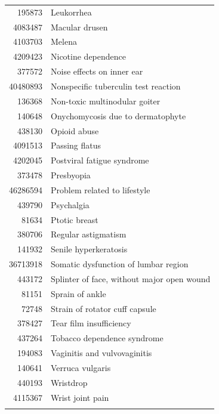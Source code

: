 \documentclass[11pt]{book}
\begin{document}
\begin{longtable}[]{@{}rl@{}}
195873 & Leukorrhea\tabularnewline
4083487 & Macular drusen\tabularnewline
4103703 & Melena\tabularnewline
4209423 & Nicotine dependence\tabularnewline
377572 & Noise effects on inner ear\tabularnewline
40480893 & Nonspecific tuberculin test reaction\tabularnewline
136368 & Non-toxic multinodular goiter\tabularnewline
140648 & Onychomycosis due to dermatophyte\tabularnewline
438130 & Opioid abuse\tabularnewline
4091513 & Passing flatus\tabularnewline
4202045 & Postviral fatigue syndrome\tabularnewline
373478 & Presbyopia\tabularnewline
46286594 & Problem related to lifestyle\tabularnewline
439790 & Psychalgia\tabularnewline
81634 & Ptotic breast\tabularnewline
380706 & Regular astigmatism\tabularnewline
141932 & Senile hyperkeratosis\tabularnewline
36713918 & Somatic dysfunction of lumbar region\tabularnewline
443172 & Splinter of face, without major open wound\tabularnewline
81151 & Sprain of ankle\tabularnewline
72748 & Strain of rotator cuff capsule\tabularnewline
378427 & Tear film insufficiency\tabularnewline
437264 & Tobacco dependence syndrome\tabularnewline
194083 & Vaginitis and vulvovaginitis\tabularnewline
140641 & Verruca vulgaris\tabularnewline
440193 & Wristdrop\tabularnewline
4115367 & Wrist joint pain\tabularnewline
&\tabularnewline
\bottomrule
\end{longtable}


\end{document}
